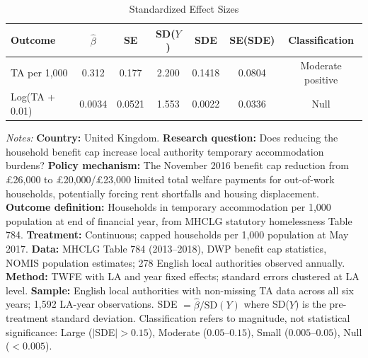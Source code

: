 \begin{table}[t]
\centering
\caption{Standardized Effect Sizes}
\label{tab:sde}
\begin{tabular}{lcccccc}
\toprule
Outcome & $\hat{\beta}$ & SE & SD($Y$) & SDE & SE(SDE) & Classification \\
\midrule
TA per 1,000 & 0.312 & 0.177 & 2.200 & 0.1418 & 0.0804 & Moderate positive \\
Log(TA + 0.01) & 0.0034 & 0.0521 & 1.553 & 0.0022 & 0.0336 & Null \\
\bottomrule
\end{tabular}
\begin{tablenotes}[flushleft]\footnotesize
\item \textit{Notes:} \textbf{Country:} United Kingdom. \textbf{Research question:} Does reducing the household benefit cap increase local authority temporary accommodation burdens? \textbf{Policy mechanism:} The November 2016 benefit cap reduction from \pounds26,000 to \pounds20,000/\pounds23,000 limited total welfare payments for out-of-work households, potentially forcing rent shortfalls and housing displacement. \textbf{Outcome definition:} Households in temporary accommodation per 1,000 population at end of financial year, from MHCLG statutory homelessness Table 784. \textbf{Treatment:} Continuous; capped households per 1,000 population at May 2017. \textbf{Data:} MHCLG Table 784 (2013--2018), DWP benefit cap statistics, NOMIS population estimates; 278 English local authorities observed annually. \textbf{Method:} TWFE with LA and year fixed effects; standard errors clustered at LA level. \textbf{Sample:} English local authorities with non-missing TA data across all six years; 1,592 LA-year observations. SDE $= \hat{\beta} / \text{SD}(Y)$ where SD($Y$) is the pre-treatment standard deviation. Classification refers to magnitude, not statistical significance: Large ($|$SDE$| > 0.15$), Moderate ($0.05$--$0.15$), Small ($0.005$--$0.05$), Null ($< 0.005$).
\end{tablenotes}
\end{table}
